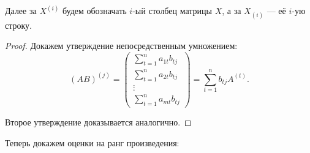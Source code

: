 \begin{remark}
    Далее за $X^{(i)}$ будем обозначать $i$-ый столбец матрицы $X$, а за $X_{(i)}$ --- её $i$-ую строку.
\end{remark}

\begin{proof}
    Докажем утверждение непосредственным умножением:
    $$
    (AB)^{(j)} = 
    \begin{pmatrix}
        \displaystyle\sum_{t = 1}^n a_{1t}b_{tj}\\
        \displaystyle\sum_{t = 1}^n a_{2t}b_{tj}\\
        \vdots\\
        \displaystyle\sum_{t = 1}^n a_{mt}b_{tj}
    \end{pmatrix} =
    \sum_{t = 1}^nb_{tj} A^{(t)}.
    $$

    Второе утверждение доказывается аналогично.
\end{proof}

Теперь докажем оценки на ранг произведения:

